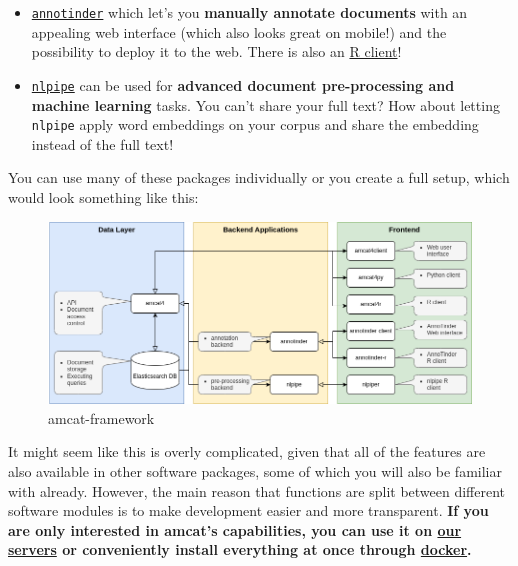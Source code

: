 \documentclass[
  letterpaper,
  DIV=11,
  numbers=noendperiod]{scrreprt}
\providecommand{\tightlist}{%
  \setlength{\itemsep}{0pt}\setlength{\parskip}{0pt}}\usepackage{longtable,booktabs,array}
\begin{document}
\begin{itemize}
\tightlist
\item
  \href{https://github.com/ccs-amsterdam/annotinder-server}{\texttt{annotinder}}
  which let's you \textbf{manually annotate documents} with an appealing
  web interface (which also looks great on mobile!) and the possibility
  to deploy it to the web. There is also an
  \href{https://github.com/ccs-amsterdam/annotinder-r}{R client}!
\item
  \href{https://github.com/ccs-amsterdam/nlpipe}{\texttt{nlpipe}} can be
  used for \textbf{advanced document pre-processing and machine
  learning} tasks. You can't share your full text? How about letting
  \texttt{nlpipe} apply word embeddings on your corpus and share the
  embedding instead of the full text!
\end{itemize}

You can use many of these packages individually or you create a full
setup, which would look something like this:

\begin{figure}[H]

{\centering \includegraphics{media/amcat-flow.drawio.png}

}

\caption{amcat-framework}

\end{figure}%

It might seem like this is overly complicated, given that all of the
features are also available in other software packages, some of which
you will also be familiar with already. However, the main reason that
functions are split between different software modules is to make
development easier and more transparent. \textbf{If you are only
interested in amcat's capabilities, you can use it on
\hyperref[run-on-our-servers]{our servers} or conveniently install
everything at once through \hyperref[setup-through-docker]{docker}.}
\end{document}
